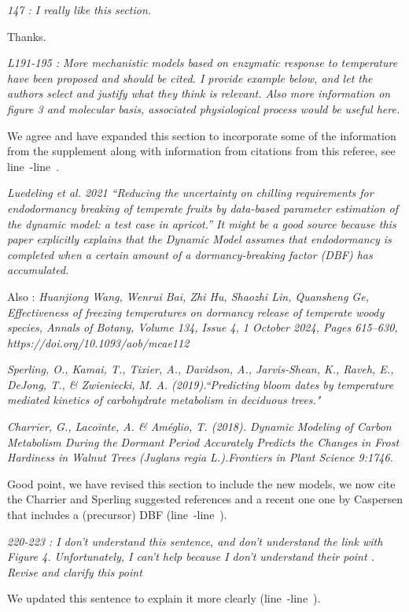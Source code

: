 \documentclass[11pt]{article}
\newcommand{\lr}[1]{line~\lineref{#1}}
\begin{document}
\emph{147 : I really like this section.}

Thanks.

\emph{L191-195 : More mechanistic models based on enzymatic response to temperature have been proposed and should be cited. I provide example below, and let the authors select and justify what they think is relevant. Also more information on figure 3 and molecular basis, associated physiological process would be useful here.}

We agree and have expanded this section to incorporate some of the information from the supplement along with information from citations from this referee, see \lr{r2momolS}-\lr{r2momolE}.

\emph{Luedeling et al. 2021  “Reducing the uncertainty on chilling requirements for endodormancy breaking of temperate fruits by data-based parameter estimation of the dynamic model: a test case in apricot.” It might be a good source because this paper explicitly explains that the Dynamic Model assumes that endodormancy is completed when a certain amount of a dormancy-breaking factor (DBF) has accumulated.}

Also :
\emph{Huanjiong Wang, Wenrui Bai, Zhi Hu, Shaozhi Lin, Quansheng Ge, Effectiveness of freezing temperatures on dormancy release of temperate woody species, Annals of Botany, Volume 134, Issue 4, 1 October 2024, Pages 615–630, https://doi.org/10.1093/aob/mcae112}

\emph{Sperling, O., Kamai, T., Tixier, A., Davidson, A., Jarvis-Shean, K., Raveh, E., DeJong, T., \& Zwieniecki, M. A. (2019).``Predicting bloom dates by temperature mediated kinetics of carbohydrate metabolism in deciduous trees."}

\emph{Charrier, G., Lacointe, A. \& Améglio, T. (2018). Dynamic Modeling of Carbon Metabolism During the Dormant Period Accurately Predicts the Changes in Frost Hardiness in Walnut Trees (Juglans regia L.).Frontiers in Plant Science 9:1746.}

Good point, we have revised this section to include the new models, we now cite the Charrier and Sperling suggested references and a recent one one by Caspersen that includes a (precursor) DBF (\lr{r2DBFS}-\lr{r2DBFE}). 

\emph{220-223 : I don’t understand this sentence, and don’t understand the link with Figure 4. Unfortunately, I can’t help because I don’t understand their point . Revise and clarify this point}

We updated this sentence to explain it more clearly (\lr{r2confS}-\lr{r2confE}).
\end{document}

